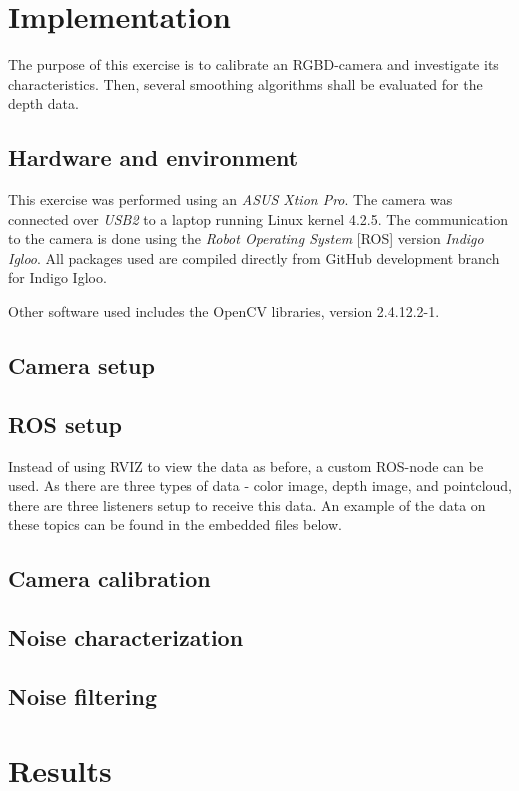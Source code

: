 \documentclass[11pt]{article}
\begin{document}
\section{Implementation}
The purpose of this exercise is to calibrate an RGBD-camera and investigate its characteristics. Then, several smoothing algorithms shall be evaluated for the depth data.
\subsection{Hardware and environment}
This exercise was performed using an \emph{ASUS Xtion Pro}. The camera was connected over \emph{USB2} to a laptop running Linux kernel 4.2.5. The communication to the camera is done using the \emph{Robot Operating System} [ROS] version \emph{Indigo Igloo}. All packages used are compiled directly from GitHub development branch for Indigo Igloo. \par
Other software used includes the OpenCV libraries, version 2.4.12.2-1.
\subsection{Camera setup}
\subsection{ROS setup}
Instead of using RVIZ to view the data as before, a custom ROS-node can be used. As there are three types of data - color image, depth image, and pointcloud, there are three listeners setup to receive this data. An example of the data on these topics can be found in the embedded files below. \par

\begin{center}
\end{center}
\subsection{Camera calibration}
   
\subsection{Noise characterization}
\subsection{Noise filtering}

\section{Results}


\end{document}
